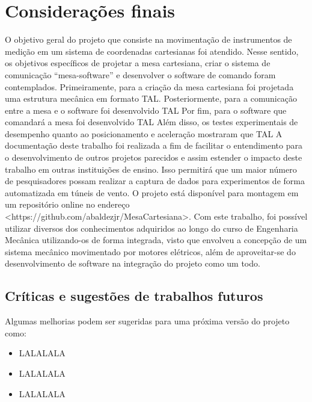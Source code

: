 \chapter{Considerações finais}
\label{chap:conclusao}

O objetivo geral do projeto que consiste na movimentação de instrumentos de medição em um sistema 
de coordenadas cartesianas foi atendido. Nesse sentido, os objetivos específicos de projetar a mesa cartesiana, criar o sistema de comunicação “mesa-software” e desenvolver o software de comando foram contemplados.
Primeiramente, para a criação da mesa cartesiana foi projetada uma estrutura mecânica em formato TAL.
Posteriormente, para a comunicação entre a mesa e o software foi desenvolvido TAL
Por fim, para o software que comandará a mesa foi desenvolvido TAL
Além disso, os testes experimentais de desempenho quanto ao posicionamento e aceleração mostraram que TAL
A documentação deste trabalho foi realizada a fim de facilitar o entendimento para o desenvolvimento de 
outros projetos parecidos e assim estender o impacto deste trabalho em outras instituições de ensino. 
Isso permitirá que um maior número de pesquisadores possam realizar a captura de dados para experimentos 
de forma automatizada em túneis de vento. O projeto está disponível para montagem em um repositório online 
no endereço <https://github.com/abaldezjr/MesaCartesiana>.
Com este trabalho, foi possível utilizar diversos dos conhecimentos adquiridos ao longo do curso de 
Engenharia Mecânica utilizando-os de forma integrada, visto que envolveu a concepção de um sistema 
mecânico movimentado por motores elétricos, além de aproveitar-se do desenvolvimento de software 
na integração do projeto como um todo.

\section{Críticas e sugestões de trabalhos futuros}\label{sec:criticas}

Algumas melhorias podem ser sugeridas para uma próxima versão do projeto como:

\begin{itemize}
    \item LALALALA
    \item LALALALA
    \item LALALALA
\end{itemize}